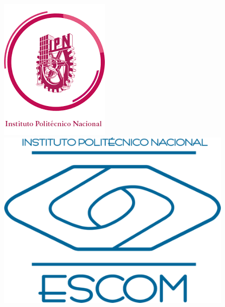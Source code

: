 \begin{titlepage}
    \begin{figure}[ht!]
        \centering
        \begin{minipage}{0.2\textwidth}
            \includegraphics[width=\linewidth]{./images/logos/logoIPN}
        \end{minipage}
        \hfill 
        \begin{minipage}{0.2\textwidth}
            \includegraphics[width=\linewidth]{./images/logos/logoESCOM} 

\end{minipage}
\end{figure}
\end{titlepage}
